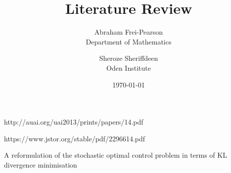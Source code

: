 \documentclass{article}
\title{Literature Review}
\author{Abraham Frei-Pearson \\
	Department of Mathematics  \\
	\and 
	Sheroze Sheriffdeen \\
	Oden Institute \\
	}
\date{\today}
\begin{document}
\maketitle

http://auai.org/uai2013/prints/papers/14.pdf

https://www.jstor.org/stable/pdf/2296614.pdf

A reformulation of the stochastic optimal control problem in terms of KL divergence minimisation \cite{rawlik2013stochastic}


 

\end{document}
